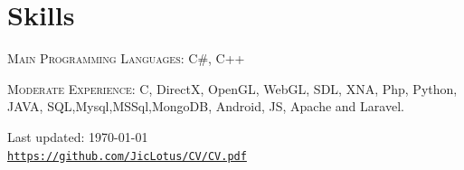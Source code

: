 \documentclass[letterpaper]{article}
\def\footerlink{https://github.com/JicLotus/CV/CV.pdf}
\newenvironment{no-indent-itemize}{
  \begin{list}{}{
    \setlength{\leftmargin}{0em}
  }
}{
  \end{list}
}
\begin{document}
\section*{Skills}
\begin{no-indent-itemize}
    
    \item\textsc{Main Programming Languages}: C\#, C++
    \item \textsc{Moderate Experience}: C, DirectX, OpenGL, WebGL, SDL, XNA, Php, Python, JAVA, SQL,Mysql,MSSql,MongoDB, Android, JS, Apache and Laravel.
    
\end{no-indent-itemize}


\bigskip
\begin{center}
  \begin{footnotesize}
    Last updated: \today \\
    \href{\footerlink}{\texttt{\footerlink}}
  \end{footnotesize}
\end{center}
\end{document}
